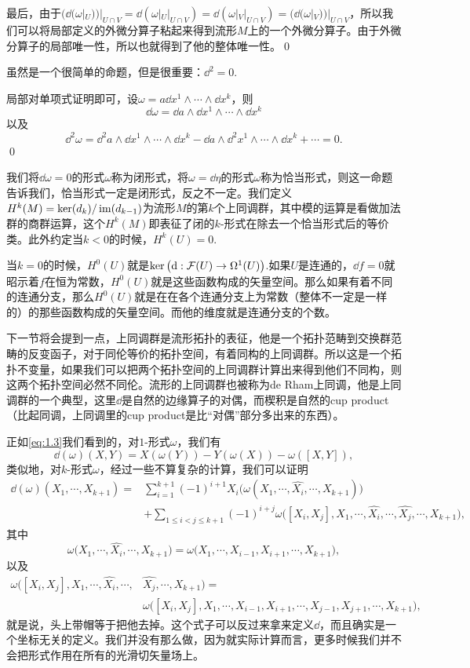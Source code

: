 最后，由于$(\dd(\omega|_U))|_{U\cap V}=\dd(\omega|_U|_{U\cap V})=\dd(\omega|_V|_{U\cap V})=(\dd(\omega|_V))|_{U\cap V}$，所以我们可以将局部定义的外微分算子粘起来得到流形$M$上的一个外微分算子。由于外微分算子的局部唯一性，所以也就得到了他的整体唯一性。\qed

\pro 虽然是一个很简单的命题，但是很重要：$\dd^2=0$.

\proof 局部对单项式证明即可，设$\omega=a\dd x^{1}\wedge\cdots\wedge \dd x^{k}$，则
\[
	\dd \omega=\dd a\wedge \dd x^{1}\wedge\cdots\wedge \dd x^{k}
\]
以及
\[
	\dd^2 \omega=\dd^2 a\wedge \dd x^{1}\wedge\cdots\wedge \dd x^{k}-\dd a\wedge \dd^2 x^{1}\wedge\cdots\wedge \dd x^{k}+\cdots=0.
\]
\qed

\para 我们将$\dd \omega=0$的形式$\omega$称为闭形式，将$\omega=\dd \eta$的形式$\omega$称为恰当形式，则这一命题告诉我们，恰当形式一定是闭形式，反之不一定。我们定义$H^k(M)=\ker(d_k)/\operatorname{im}(d_{k-1})$为流形$M$的第$k$个上同调群，其中模的运算是看做加法群的商群运算，这个$H^k(M)$即表征了闭的$k$-形式在除去一个恰当形式后的等价类。此外约定当$k<0$的时候，$H^k(U)=0$.

当$k=0$的时候，$H^0(U)$就是$\mathrm{ker}\left(\mathrm{d}:\mathcal{F}(U)\to\Omega^1(U)\right)$.如果$U$是连通的，$\dd f=0$就昭示着$f$在恒为常数，$H^0(U)$就是这些函数构成的矢量空间。那么如果有着不同的连通分支，那么$H^0(U)$就是在在各个连通分支上为常数（整体不一定是一样的）的那些函数构成的矢量空间。而他的维度就是连通分支的个数。

下一节将会提到一点，上同调群是流形拓扑的表征，他是一个拓扑范畴到交换群范畴的反变函子，对于同伦等价的拓扑空间，有着同构的上同调群。所以这是一个拓扑不变量，如果我们可以把两个拓扑空间的上同调群计算出来得到他们不同构，则这两个拓扑空间必然不同伦。流形的上同调群也被称为de Rham上同调，他是上同调群的一个典型，这里$\dd$是自然的边缘算子的对偶，而楔积是自然的cup product（比起同调，上同调里的cup product是比“对偶”部分多出来的东西）。

\para 正如\eqref{eq:1.3}我们看到的，对$1$-形式$\omega$，我们有
\[
	\dd(\omega)(X,Y)=X(\omega(Y))-Y(\omega(X))-\omega([X,Y]),
\]
类似地，对$k$-形式$\omega$，经过一些不算复杂的计算，我们可以证明
\[
\begin{aligned}
	\dd(\omega)(X_1,\cdots,X_{k+1})=&\sum_{i=1}^{k+1}(-1)^{i+1}X_i\bigl(\omega(X_1,\cdots,\hat{X_i},\cdots,X_{k+1})\bigr)\\
	&+\sum_{1\leq i<j\leq k+1}(-1)^{i+j}\omega\bigl([X_i,X_j],X_1,\cdots,\hat{X_i},\cdots,\hat{X_j},\cdots,X_{k+1}\bigr),
\end{aligned}
\]
其中
\[
	\omega\bigl(X_1,\cdots,\hat{X_i},\cdots,X_{k+1}\bigr)=\omega\bigl(X_1,\cdots,X_{i-1},X_{i+1},\cdots,X_{k+1}\bigr),
\]
以及
\[
\begin{aligned}
	\omega\bigl([X_i,X_j],X_1,\cdots,\hat{X_i},\cdots,&\hat{X_j},\cdots,X_{k+1}\bigr)=\\
	&\omega\bigl([X_i,X_j],X_1,\cdots,X_{i-1},X_{i+1},\cdots,X_{j-1},X_{j+1},\cdots,X_{k+1}\bigr),
\end{aligned}
\]
就是说，头上带帽等于把他去掉。这个式子可以反过来拿来定义$\dd$，而且确实是一个坐标无关的定义。我们并没有那么做，因为就实际计算而言，更多时候我们并不会把形式作用在所有的光滑切矢量场上。

